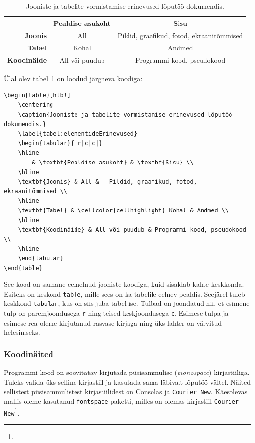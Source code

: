 \begin{table}[htb!]
    \centering
    \caption{Jooniste ja tabelite vormistamise erinevused lõputöö dokumendis.}
    \label{tabel:elementideErinevused}
    \begin{tabular}{|r|c|c|}
    \hline
    & \textbf{Pealdise asukoht} & \textbf{Sisu} \\
    \hline
    \textbf{Joonis} & All &   Pildid, graafikud, fotod, ekraanitõmmised \\
    \hline
    \textbf{Tabel} & \cellcolor{cellhighlight} Kohal & Andmed \\
    \hline
    \textbf{Koodinäide} & All või puudub & Programmi kood, pseudokood \\
    \hline
    \end{tabular}
\end{table}

Ülal olev tabel~\ref{tabel:elementideErinevused} on loodud järgneva koodiga:
\begin{verbatim}
\begin{table}[htb!]
    \centering
    \caption{Jooniste ja tabelite vormistamise erinevused lõputöö dokumendis.}
    \label{tabel:elementideErinevused}
    \begin{tabular}{|r|c|c|}
    \hline
        & \textbf{Pealdise asukoht} & \textbf{Sisu} \\
    \hline
    \textbf{Joonis} & All &   Pildid, graafikud, fotod, ekraanitõmmised \\
    \hline
    \textbf{Tabel} & \cellcolor{cellhighlight} Kohal & Andmed \\
    \hline
    \textbf{Koodinäide} & All või puudub & Programmi kood, pseudokood \\
    \hline
    \end{tabular}
\end{table}
\end{verbatim}

See kood on sarnane eelnelnud jooniste koodiga, kuid sisaldab kahte keskkonda. Esiteks on keskond \verb|table|, mille sees on ka tabelile eelnev pealdis. Seejärel tuleb keskkond \verb|tabular|, kus on siis juba tabel ise. Tulbad on joondatud nii, et esimene tulp on paremjoondusega \verb|r| ning teised keskjoondusega \verb|c|. Esimese tulpa ja esimese rea oleme kirjutanud rasvase kirjaga ning üks lahter on värvitud helesiniseks.

\subsubsection{Koodinäited}
Programmi kood on soovitatav kirjutada püsisammulise (\emph{monospace}) kirjastiiliga. Tuleks valida üks selline kirjastiil ja kasutada sama läbivalt lõputöö vältel. Näited sellistest püsisammulistest kirjastiilidest on Consolas ja \texttt{Courier New}. Käesolevas mallis oleme kasutanud \verb|fontspace| paketti, milles on olemas kirjastiil \texttt{Courier New}\footnote{}.

